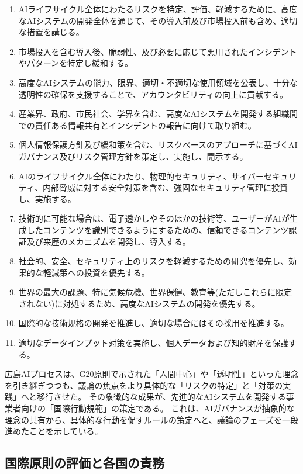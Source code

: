 \begin{enumerate}
  \item AIライフサイクル全体にわたるリスクを特定、評価、軽減するために、高度なAIシステムの開発全体を通じて、その導入前及び市場投入前も含め、適切な措置を講じる。
  \item 市場投入を含む導入後、脆弱性、及び必要に応じて悪用されたインシデントやパターンを特定し緩和する。
  \item 高度なAIシステムの能力、限界、適切・不適切な使用領域を公表し、十分な透明性の確保を支援することで、アカウンタビリティの向上に貢献する。
  \item 産業界、政府、市民社会、学界を含む、高度なAIシステムを開発する組織間での責任ある情報共有とインシデントの報告に向けて取り組む。
  \item 個人情報保護方針及び緩和策を含む、リスクベースのアプローチに基づくAIガバナンス及びリスク管理方針を策定し、実施し、開示する。
  \item AIのライフサイクル全体にわたり、物理的セキュリティ、サイバーセキュリティ、内部脅威に対する安全対策を含む、強固なセキュリティ管理に投資し、実施する。
  \item 技術的に可能な場合は、電子透かしやそのほかの技術等、ユーザーがAIが生成したコンテンツを識別できるようにするための、信頼できるコンテンツ認証及び来歴のメカニズムを開発し、導入する。
  \item 社会的、安全、セキュリティ上のリスクを軽減するための研究を優先し、効果的な軽減策への投資を優先する。
  \item 世界の最大の課題、特に気候危機、世界保健、教育等(ただしこれらに限定されない)に対処するため、高度なAIシステムの開発を優先する。
  \item 国際的な技術規格の開発を推進し、適切な場合にはその採用を推進する。
  \item 適切なデータインプット対策を実施し、個人データおよび知的財産を保護する。
\end{enumerate}

広島AIプロセスは、G20原則で示された「人間中心」や「透明性」といった理念を引き継ぎつつも、議論の焦点をより具体的な「リスクの特定」と「対策の実践」へと移行させた。
その象徴的な成果が、先進的なAIシステムを開発する事業者向けの「国際行動規範」の策定である。
これは、AIガバナンスが抽象的な理念の共有から、具体的な行動を促すルールの策定へと、議論のフェーズを一段進めたことを示している。

\subsection{国際原則の評価と各国の責務}

